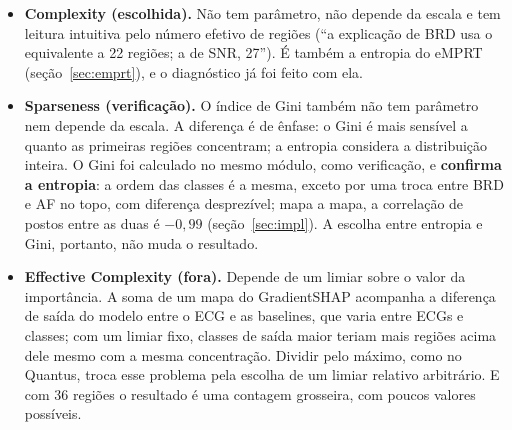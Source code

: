 \documentclass[11pt,a4paper]{article}
\begin{document}
\begin{itemize}
\item \textbf{Complexity (escolhida).} Não tem parâmetro, não depende da escala e tem leitura intuitiva pelo número efetivo de regiões (“a explicação de BRD usa o equivalente a 22 regiões; a de SNR, 27”). É também a entropia do eMPRT (seção~\ref{sec:emprt}), e o diagnóstico já foi feito com ela.
\item \textbf{Sparseness (verificação).} O índice de Gini também não tem parâmetro nem depende da escala. A diferença é de ênfase: o Gini é mais sensível a quanto as primeiras regiões concentram; a entropia considera a distribuição inteira. O Gini foi calculado no mesmo módulo, como verificação, e \textbf{confirma a entropia}: a ordem das classes é a mesma, exceto por uma troca entre BRD e AF no topo, com diferença desprezível; mapa a mapa, a correlação de postos entre as duas é $-0{,}99$ (seção~\ref{sec:impl}). A escolha entre entropia e Gini, portanto, não muda o resultado.
\item \textbf{Effective Complexity (fora).} Depende de um limiar sobre o valor da importância. A soma de um mapa do GradientSHAP acompanha a diferença de saída do modelo entre o ECG e as baselines, que varia entre ECGs e classes; com um limiar fixo, classes de saída maior teriam mais regiões acima dele mesmo com a mesma concentração. Dividir pelo máximo, como no Quantus, troca esse problema pela escolha de um limiar relativo arbitrário. E com 36 regiões o resultado é uma contagem grosseira, com poucos valores possíveis.
\end{itemize}
\end{document}
